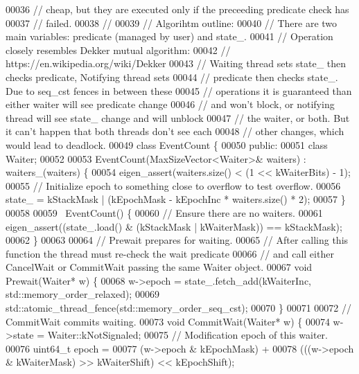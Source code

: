 \begin{DoxyCode}
00036 \textcolor{comment}{// cheap, but they are executed only if the preceeding predicate check has}
00037 \textcolor{comment}{// failed.}
00038 \textcolor{comment}{//}
00039 \textcolor{comment}{// Algorihtm outline:}
00040 \textcolor{comment}{// There are two main variables: predicate (managed by user) and state\_.}
00041 \textcolor{comment}{// Operation closely resembles Dekker mutual algorithm:}
00042 \textcolor{comment}{// https://en.wikipedia.org/wiki/Dekker%
00043 \textcolor{comment}{// Waiting thread sets state\_ then checks predicate, Notifying thread sets}
00044 \textcolor{comment}{// predicate then checks state\_. Due to seq\_cst fences in between these}
00045 \textcolor{comment}{// operations it is guaranteed than either waiter will see predicate change}
00046 \textcolor{comment}{// and won't block, or notifying thread will see state\_ change and will unblock}
00047 \textcolor{comment}{// the waiter, or both. But it can't happen that both threads don't see each}
00048 \textcolor{comment}{// other changes, which would lead to deadlock.}
00049 \textcolor{keyword}{class }EventCount \{
00050  \textcolor{keyword}{public}:
00051   \textcolor{keyword}{class }Waiter;
00052 
00053   EventCount(MaxSizeVector<Waiter>& waiters) : waiters\_(waiters) \{
00054     eigen\_assert(waiters.size() < (1 << kWaiterBits) - 1);
00055     \textcolor{comment}{// Initialize epoch to something close to overflow to test overflow.}
00056     state\_ = kStackMask | (kEpochMask - kEpochInc * waiters.size() * 2);
00057   \}
00058 
00059   ~EventCount() \{
00060     \textcolor{comment}{// Ensure there are no waiters.}
00061     eigen\_assert((state\_.load() & (kStackMask | kWaiterMask)) == kStackMask);
00062   \}
00063 
00064   \textcolor{comment}{// Prewait prepares for waiting.}
00065   \textcolor{comment}{// After calling this function the thread must re-check the wait predicate}
00066   \textcolor{comment}{// and call either CancelWait or CommitWait passing the same Waiter object.}
00067   \textcolor{keywordtype}{void} Prewait(Waiter* w) \{
00068     w->epoch = state\_.fetch\_add(kWaiterInc, std::memory\_order\_relaxed);
00069     std::atomic\_thread\_fence(std::memory\_order\_seq\_cst);
00070   \}
00071 
00072   \textcolor{comment}{// CommitWait commits waiting.}
00073   \textcolor{keywordtype}{void} CommitWait(Waiter* w) \{
00074     w->state = Waiter::kNotSignaled;
00075     \textcolor{comment}{// Modification epoch of this waiter.}
00076     uint64\_t epoch =
00077         (w->epoch & kEpochMask) +
00078         (((w->epoch & kWaiterMask) >> kWaiterShift) << kEpochShift);
}
\end{DoxyCode}
